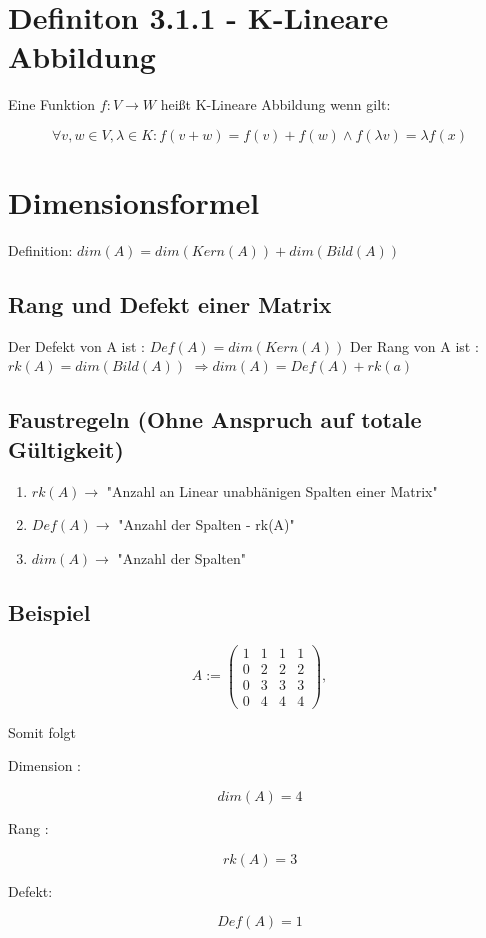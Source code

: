 \documentclass[12pt]{article}
\begin{document}
    \section{Definiton 3.1.1 - K-Lineare Abbildung}
    Eine Funktion  $f:V\rightarrow W$ \nolinebreak heißt K-Lineare Abbildung wenn gilt:

    \[\forall v,w\in V, \lambda \in K : f(v+w) = f(v) + f(w) \wedge f(\lambda v) = \lambda f(x)\]

    \section{Dimensionsformel}
    Definition: $dim(A)=dim(Kern(A))+dim(Bild(A))$

    \subsection{Rang und Defekt einer Matrix}

    Der Defekt von A ist : $Def(A) = dim(Kern(A))$ \newline
    \newline
    Der Rang von A ist : $rk(A)=dim(Bild(A))$ \newline
    \newline
    $\Rightarrow dim(A)=Def(A)+rk(a)$


    \subsection{Faustregeln (Ohne Anspruch auf totale Gültigkeit)}

    \begin{enumerate}
        \item $rk(A)\rightarrow$ "Anzahl an Linear unabhänigen Spalten einer Matrix"
        \item $Def(A) \rightarrow$ "Anzahl der Spalten - rk(A)"
        \item $dim(A) \rightarrow$ "Anzahl der Spalten"
    \end{enumerate}


    \subsection{Beispiel}



    \[A:=\begin{pmatrix}
             1&1&1&1\\
             0&2&2&2\\
             0&3&3&3\\
             0&4&4&4
    \end{pmatrix},\]

    Somit folgt

    Dimension :

    \[dim(A) = 4\]

    Rang :

    \[rk(A) = 3\]

    Defekt:

    \[Def(A) = 1\]
\end{document}
